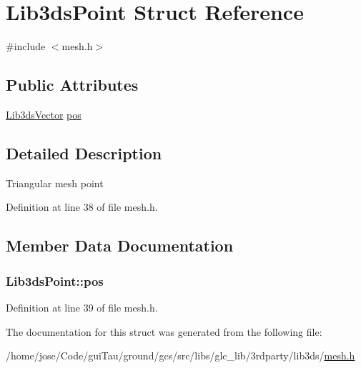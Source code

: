 \hypertarget{struct_lib3ds_point}{\section{Lib3ds\-Point Struct Reference}
\label{struct_lib3ds_point}
}


{\ttfamily \#include $<$mesh.\-h$>$}

\subsection*{Public Attributes}
\begin{DoxyCompactItemize}
\item 
\hyperlink{group__vector_ga6ac1c3b3ef15381ebf6baf264d658dcf}{Lib3ds\-Vector} \hyperlink{struct_lib3ds_point_a730bd421ae707e59ca4fbec7f22b3839}{pos}
\end{DoxyCompactItemize}


\subsection{Detailed Description}
Triangular mesh point 

Definition at line 38 of file mesh.\-h.



\subsection{Member Data Documentation}
\hypertarget{struct_lib3ds_point_a730bd421ae707e59ca4fbec7f22b3839}{
\subsubsection[{pos}]{ Lib3ds\-Point\-::pos}}\label{struct_lib3ds_point_a730bd421ae707e59ca4fbec7f22b3839}


Definition at line 39 of file mesh.\-h.



The documentation for this struct was generated from the following file\-:\begin{DoxyCompactItemize}
\item 
/home/jose/\-Code/gui\-Tau/ground/gcs/src/libs/glc\-\_\-lib/3rdparty/lib3ds/\hyperlink{mesh_8h}{mesh.\-h}\end{DoxyCompactItemize}
